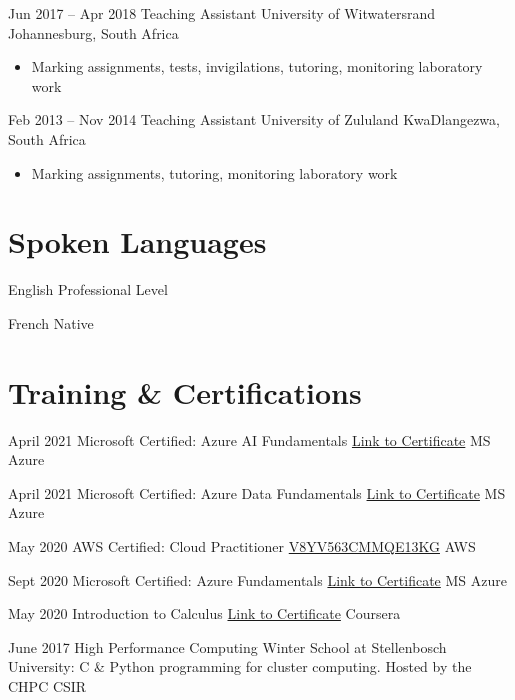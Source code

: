 \documentclass[11pt, letterpaper]{moderncv}        %
\begin{document}
\cventry
{Jun 2017 -- Apr 2018}
{Teaching Assistant}
{University of Witwatersrand}
{Johannesburg, South Africa}
{}
{\begin{itemize}%
	\item Marking assignments, tests, invigilations, tutoring, monitoring laboratory work
	\end{itemize}}
\cventry
{Feb 2013 -- Nov 2014}
{Teaching Assistant}
{University of Zululand}
{KwaDlangezwa, South Africa}
{}
{\begin{itemize}%
	\item Marking assignments, tutoring, monitoring laboratory work
	\end{itemize}}

\section{Spoken Languages}

\cventry
{}
{English}
{Professional Level}
{}
{}
{}

\cventry
{}
{French}
{Native}
{}
{}
{}

\section{Training \& Certifications}

\cventry
{April 2021}
{Microsoft Certified: Azure AI Fundamentals}
{\href{https://www.credly.com/badges/80d60ce2-32b0-475e-9959-05b452f9355a/public_url}{Link to Certificate}}
{MS Azure}
{}
{}

\cventry
{April 2021}
{Microsoft Certified: Azure Data Fundamentals}
{\href{https://www.credly.com/badges/a08ad4dc-3cee-4771-9183-561a33e3ae81/public_url}{Link to Certificate}}
{MS Azure}
{}
{}

\cventry
{May 2020}
{AWS Certified: Cloud Practitioner}
{\href{http://aws.amazon.com/verification}{V8YV563CMMQE13KG}}
{AWS}
{}
{}

\cventry
{Sept 2020}
{Microsoft Certified: Azure Fundamentals}
{\href{https://www.youracclaim.com/badges/ee4c4a98-5687-4fcf-8fce-7ee92249e54f?source=linked_in_profile}{Link to Certificate}}
{MS Azure}
{}
{}

\cventry
{May 2020}
{Introduction to Calculus}
{\href{https://www.coursera.org/account/accomplishments/verify/VNY949FASZA2}{Link to Certificate}}
{Coursera}
{}
{}

\cventry
{June 2017}
{High Performance Computing Winter School at Stellenbosch University: C \& Python programming for cluster computing.}
{Hosted by the CHPC}
{CSIR}
{}
{}
			
\end{document}
